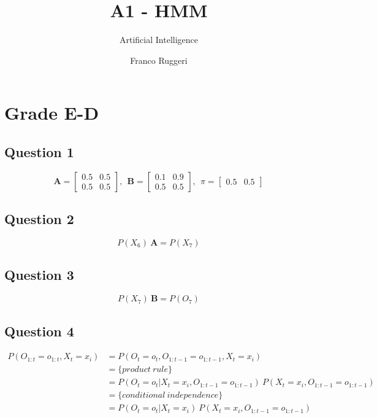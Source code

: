 \documentclass{scrartcl}
\title{A1 - HMM}
\subtitle{Artificial Intelligence}
\author{Franco Ruggeri}
\begin{document}
\maketitle

\section{Grade E-D}

\subsection{Question 1}

\begin{equation}
 \mathbf{A} = 
 \begin{bmatrix}
  0.5 & 0.5 \\
  0.5 & 0.5
 \end{bmatrix} 
 ,\ \ \mathbf{B} = 
 \begin{bmatrix}
  0.1 & 0.9 \\
  0.5 & 0.5
 \end{bmatrix} 
 ,\ \ \pi = 
 \begin{bmatrix}
  0.5 & 0.5
 \end{bmatrix} 
\end{equation}

\subsection{Question 2}

\begin{equation}
 P(X_6)\ \mathbf{A} = P(X_7)
\end{equation}
 
\subsection{Question 3}

\begin{equation}
 P(X_7)\ \mathbf{B} = P(O_7)
\end{equation}

\subsection{Question 4}

\begin{align}
 P(O_{1:t}=o_{1:t}, X_t=x_i) &= P(O_t=o_t, O_{1:t-1}=o_{1:t-1}, X_t=x_i) \nonumber \\
 &= \{product\ rule\} \nonumber \\
 &= P(O_t=o_t | X_t=x_i, O_{1:t-1}=o_{1:t-1})\ P(X_t=x_i, O_{1:t-1}=o_{1:t-1}) \nonumber \\
 &= \{conditional\ independence\} \nonumber \\
 &= P(O_t=o_t | X_t=x_i)\ P(X_t=x_i, O_{1:t-1}=o_{1:t-1})
\end{align}
\end{document}
